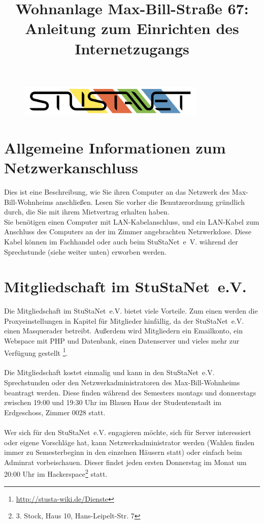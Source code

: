 \documentclass[a4paper,12pt]{scrartcl}
\title{Wohnanlage Max-Bill-Straße 67:\\
       Anleitung zum Einrichten des Internetzugangs}
\begin{document}
\maketitle

\begin{figure}[t!]
   \centering
   \vspace{-20pt}
   \includegraphics[width=0.8\textwidth,keepaspectratio]{Bilder/StuStaNet_Logo}
   \vspace{-40pt}
\end{figure}

\section*{Allgemeine Informationen zum Netzwerkanschluss}

Dies ist eine Beschreibung, wie Sie ihren Computer an das Netzwerk des Max-Bill-Wohnheims anschließen. Lesen Sie vorher die Benutzerordnung gründlich durch, die Sie mit ihrem Mietvertrag erhalten haben.
\\Sie benötigen einen Computer mit LAN-Kabelanschluss, und ein LAN-Kabel zum Anschluss des Computers an der im Zimmer angebrachten Netzwerkdose. Diese Kabel können im Fachhandel oder auch beim StuStaNet~e~V. während der Sprechstunde (siehe weiter unten) erworben werden.

\section*{Mitgliedschaft im StuStaNet~e.V.}

Die Mitgliedschaft im StuStaNet~e.V. bietet viele Vorteile. Zum einen werden die Proxyeinstellungen in Kapitel \emph{} für Mitglieder hinfällig, da der StuStaNet~e.V. einen Masquerader betreibt. Außerdem wird Mitgliedern ein Emailkonto, ein Webspace mit PHP und Datenbank, einen Datenserver und vieles mehr  zur Verfügung gestellt \footnote{\url{http://stusta-wiki.de/Dienste}}.
\\
\\Die Mitgliedschaft kostet einmalig  und kann in den StuStaNet~e.V. Sprechstunden oder den Netzwerkadministratoren des Max-Bill-Wohnheims beantragt werden. Diese finden während des Semesters montags und donnerstags zwischen 19:00 und 19:30 Uhr im Blauen Haus der Studentenstadt im Erdgeschoss, Zimmer 0028 statt.
\\
\\Wer sich für den StuStaNet~e.V. engagieren möchte, sich für Server interessiert oder eigene Vorschläge hat, kann Netzwerkadministrator werden (Wahlen finden immer zu Semesterbeginn in den einzelnen Häusern statt) oder einfach beim Adminrat vorbeischauen. Dieser findet jeden ersten Donnerstag im Monat um 20:00 Uhr im Hackerspace\footnote{3. Stock, Haus 10, Hans-Leipelt-Str. 7} statt.
\end{document}
